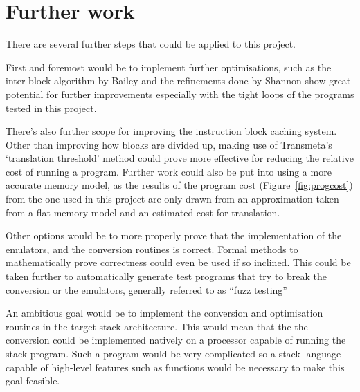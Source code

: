 \section{Further work}\label{sec:furtherwork}
There are several further steps that could be applied to this project.

First and foremost would be to implement further optimisations, such as the
inter-block algorithm by Bailey and the refinements done by Shannon show great
potential for further improvements especially with the tight loops of the
programs tested in this project.

There's also further scope for improving the instruction block caching system.
Other than improving how blocks are divided up, making use of Transmeta's
`translation threshold' method could prove more effective for reducing the
relative cost of running a program. Further work could also be put into using a
more accurate memory model, as the results of the program cost
(Figure~\ref{fig:progcost}) from the one used in this project are only drawn
from an approximation taken from a flat memory model and an estimated cost for
translation.

Other options would be to more properly prove that the implementation of the
emulators, and the conversion routines is correct. Formal methods to
mathematically prove correctness could even be used if so inclined. This could
be taken further to automatically generate test programs that try to break the
conversion or the emulators, generally referred to as ``fuzz testing''

An ambitious goal would be to implement the conversion and optimisation routines
in the target stack architecture. This would mean that the the conversion could
be implemented natively on a processor capable of running the stack program.
Such a program would be very complicated so a stack language capable of
high-level features such as functions would be necessary to make this goal
feasible.
